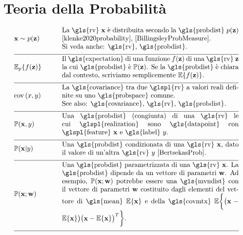 \newpage
\section*{Teoria della Probabilità} 
\begin{align}
	&\featurevec \sim p(\vz)  \quad\quad & \parbox{.75\textwidth}{La \gls{rv} $\featurevec$ è distribuita secondo la \gls{probdist} $p(\vz)$ \cite{klenke2020probability}, \cite{BillingsleyProbMeasure}.
		\\ Si veda anche: \gls{rv}, \gls{probdist}.}  \nonumber \\[2mm] \hline \nonumber\\[-5mm]  
	&\expect_{p} \{ f(\datapoint) \}  \quad\quad & \parbox{.75\textwidth}{Il \gls{expectation} di una funzione $f(\datapoint)$ di una \gls{rv} $\datapoint$ la cui \gls{probdist} è $\prob{\datapoint}$. Se la \gls{probdist} è chiara dal contesto, scriviamo semplicemente $\expect \{ f(\datapoint) \}$. }  \nonumber \\[2mm] \hline \nonumber\\[-5mm]    
	&\cov{x}{y} \quad\quad & \parbox{.75\textwidth}{La \gls{covariance} tra due \glspl{rv} a valori reali definite su uno \gls{probspace} comune. 
		\\ See also: \gls{covariance}, \gls{rv}, \gls{probdist}.}  \nonumber \\[2mm] \hline \nonumber\\[-5mm]
	&\prob{\featurevec,\truelabel} \quad\quad & \parbox{.75\textwidth}{Una \gls{probdist} (congiunta) di una \gls{rv} 
		le cui \glspl{realization} sono \gls{datapoint} con \glspl{feature} $\featurevec$ e \gls{label} $\truelabel$.} \nonumber        \nonumber \\[2mm] \hline \nonumber\\[-5mm]        
	&\prob{\featurevec|\truelabel} \quad\quad & \parbox{.75\textwidth}{Una \gls{probdist} condizionata di una \gls{rv} 
		$\featurevec$, dato il valore di un'altra \gls{rv} $\truelabel$ \cite[Sec.\ 3.5]{BertsekasProb}. } \nonumber       \nonumber \\[2mm] \hline \nonumber\\[-5mm]           
	&\prob{\featurevec;\weights} \quad\quad & \parbox{.75\textwidth}{Una \gls{probdist} parametrizzata di una \gls{rv} $\featurevec$. 
		La \gls{probdist} dipende da un vettore di parametri $\weights$. Ad esempio, $\prob{\featurevec;\weights}$ potrebbe essere una \gls{mvndist} con il vettore di parametri $\weights$ costituito dagli elementi del vettore di \gls{mean} $\expect \{ \featurevec \}$ e della \gls{covmtx} $\expect \bigg \{ \big( \featurevec - \expect \{ \featurevec \}\big) \big( \featurevec - \expect \{ \featurevec \}\big)^{T}  \bigg\}$.}  \nonumber \\[2mm] \hline \nonumber\\[-5mm]

\end{align}

